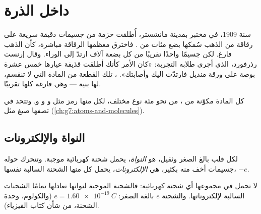 \chapter{داخل الذرة}\label{ch:g9:inside-the-atom}

سنة 1909، في مختبر بمدينة مانشستر، أُطلقت حزمة من جسيمات دقيقة سريعة على
رقاقة من الذهب سُمكها بضع مئات من . فاخترق معظمها الرقاقة مباشرة،
كأن الذهب فارغ. لكن جسيمًا واحدًا تقريبًا من كل بضعة آلاف ارتدّ إلى
الوراء. وقال إرنست رذرفورد، الذي أجرى طلابه التجربة: «كان الأمر كأنك
أطلقت قذيفة عيارها خمس عشرة بوصة على ورقة منديل فارتدّت إليك وأصابتك».
، تلك القطعة من المادة التي لا تنقسم، لها بنية --- وهي فارغة كلها
تقريبًا.

\begin{recall}
كل المادة مكوّنة من ، من نحو مئة نوع مختلف، لكل منها رمز مثل 
و و و. وتتحد  في  تصفها صيغ مثل 
(\cref{ch:g7:atoms-and-molecules}).
\end{recall}

\section{النواة والإلكترونات}

\begin{definition}\label{def:g9:inside-the-atom:nucleus}
لكل  قلب بالغ الصغر وثقيل، هو \emph{النواة}، يحمل شحنة
كهربائية موجبة. وتتحرك حوله جسيمات أخف منه بكثير، هي
\emph{الإلكترونات}، يحمل كل منها الشحنة السالبة نفسها،
$-e$.
\end{definition}

\begin{proposition}\label{prop:g9:inside-the-atom:neutral}
لا تحمل  في مجموعها أي شحنة كهربائية: فالشحنة الموجبة لنواتها تعادلها
تمامًا الشحنات السالبة لإلكتروناتها. والشحنة $e$ بالغة الصغر:
$e = \qty{1.60e-19}{C}$ (والكولوم، وحدة الشحنة، من شأن كتاب
الفيزياء).
\end{proposition}

